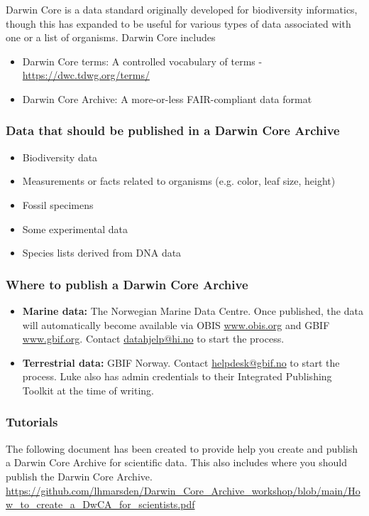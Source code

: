 \documentclass[a4paper,12pt]{article}
\begin{document}
Darwin Core is a data standard originally developed for biodiversity informatics, though this has expanded to be useful for various types of data associated with one or a list of organisms. Darwin Core includes
\begin{itemize}
\item Darwin Core terms: A controlled vocabulary of terms - \url{https://dwc.tdwg.org/terms/}
\item Darwin Core Archive: A more-or-less FAIR-compliant data format
\end{itemize}

\subsubsection{Data that should be published in a Darwin Core Archive}
\begin{itemize}
\item{Biodiversity data}
\item{Measurements or facts related to organisms (e.g. color, leaf size, height)}
\item{Fossil specimens}
\item{Some experimental data}
\item{Species lists derived from DNA data}
\end{itemize}

\subsubsection{Where to publish a Darwin Core Archive}

\begin{itemize}
\item \textbf{Marine data:} The Norwegian Marine Data Centre. Once published, the data will automatically become available via OBIS \url{www.obis.org} and GBIF \url{www.gbif.org}. Contact \href{mailto:datahjelp@hi.no}{datahjelp@hi.no} to start the process.
\item \textbf{Terrestrial data: } GBIF Norway. Contact \href{mailto:helpdesk@gbif.no}{helpdesk@gbif.no} to start the process. Luke also has admin credentials to their Integrated Publishing Toolkit at the time of writing. 
\end{itemize}

\subsubsection{Tutorials}
 
The following document has been created to provide help you create and publish a Darwin Core Archive for scientific data. This also includes where you should publish the Darwin Core Archive.
\url{https://github.com/lhmarsden/Darwin_Core_Archive_workshop/blob/main/How_to_create_a_DwCA_for_scientists.pdf}
\end{document}
